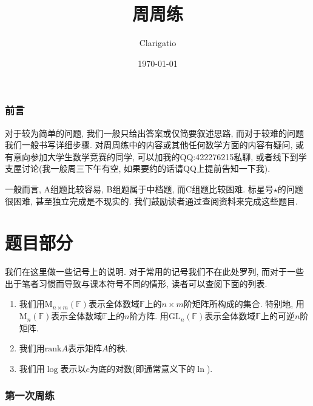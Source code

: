 \documentclass{article}
\title{\textbf{周周练}}
\author{Clarigatio}
\date{\today}
\begin{document}
\maketitle
\tableofcontents
\newpage
\section*{前言}
对于较为简单的问题, 我们一般只给出答案或仅简要叙述思路, 而对于较难的问题我们一般书写详细步骤. 对周周练中的内容或其他任何数学方面的内容有疑问, 或有意向参加大学生数学竞赛的同学, 可以加我的QQ:422276215私聊, 或者线下到学支屋讨论(我一般周三下午有空, 如果要约的话请QQ上提前告知一下我).\par
一般而言, A组题比较容易, B组题属于中档题, 而C组题比较困难. 标星号$\star$的问题很困难, 甚至独立完成是不现实的. 我们鼓励读者通过查阅资料来完成这些题目.\par
\newpage
\part{题目部分}
我们在这里做一些记号上的说明. 对于常用的记号我们不在此处罗列, 而对于一些出于笔者习惯而导致与课本符号不同的情形, 读者可以查阅下面的列表.
\begin{enumerate}
    \item 我们用$\mathrm{M}_{n\times m}(\mathbb{F})$表示全体数域$\mathbb{F}$上的$n\times m$阶矩阵所构成的集合. 特别地, 用$\mathrm{M}_n(\mathbb{F})$表示全体数域$\mathbb{F}$上的$n$阶方阵. 用$\mathrm{GL}_n(\mathbb{F})$表示全体数域$\mathbb{F}$上的可逆$n$阶矩阵.
    \item 我们用$\mathrm{rank}A$表示矩阵$A$的秩.
    \item 我们用$\log$表示以$e$为底的对数(即通常意义下的$\ln$).
\end{enumerate}
\newpage
\section{第一次周练}
\end{document}

